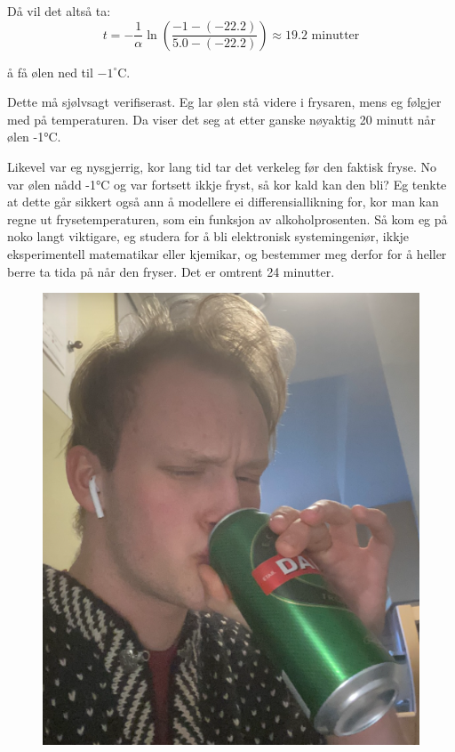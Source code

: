 \documentclass[a4paper,12pt]{article}
\begin{document}
Då vil det altså ta:
\[
t = -\frac{1}{\alpha} \ln\left(\frac{-1 - (-22.2)}{5.0 - (-22.2)}\right) \approx 19.2 \text{ minutter}
\]

å få ølen ned til $-1^\circ$C.


Dette må sjølvsagt verifiserast. Eg lar ølen stå videre i frysaren, mens eg følgjer med på temperaturen. Da viser det seg at etter ganske nøyaktig 20 minutt når ølen -1°C. 

Likevel var eg nysgjerrig, kor lang tid tar det verkeleg før den faktisk fryse. No var ølen nådd  -1°C og var fortsett ikkje fryst, så kor kald kan den bli? Eg tenkte at dette går sikkert også ann å modellere ei differensiallikning for, kor man kan regne ut frysetemperaturen, som ein funksjon av alkoholprosenten. Så kom eg på noko langt viktigare, eg studera for å bli elektronisk systemingeniør, ikkje eksperimentell matematikar eller kjemikar, og bestemmer meg derfor for å heller berre ta tida på når den fryser. Det er omtrent 24 minutter. 

\begin{figure}[h!]
    \centering
    \includegraphics[width=0.8\linewidth]{The fruit of my labour.png}
    \caption{}
    \label{ØL}
\end{figure}
\end{document}
